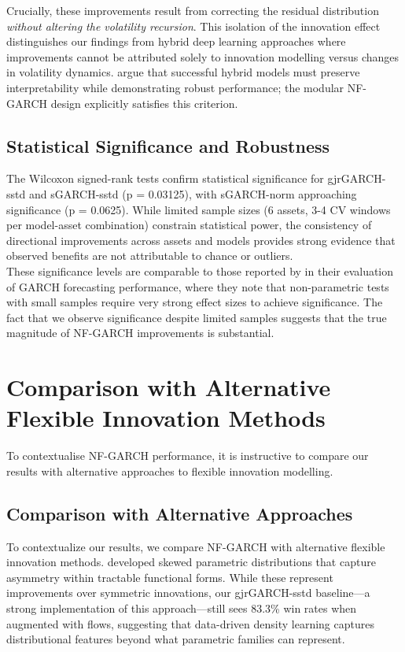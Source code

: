 \documentclass[oneside,12pt]{CUEDthesisPSnPDF}
\newcommand{\textcite}{\citet}
\newcommand{\parencite}{\citep}
\begin{document}
Crucially, these improvements result from correcting the residual distribution \emph{without altering the volatility recursion}. This isolation of the innovation effect distinguishes our findings from hybrid deep learning approaches \parencite{bao2017deep, kim2018forecasting} where improvements cannot be attributed solely to innovation modelling versus changes in volatility dynamics. \textcite{harvey2022machine} argue that successful hybrid models must preserve interpretability while demonstrating robust performance; the modular NF-GARCH design explicitly satisfies this criterion.\\

\subsection{Statistical Significance and Robustness}
\noindent
The Wilcoxon signed-rank tests \parencite{demvsar2006statistical} confirm statistical significance for gjrGARCH-sstd and sGARCH-sstd (p = 0.03125), with sGARCH-norm approaching significance (p = 0.0625). While limited sample sizes (6 assets, 3-4 CV windows per model-asset combination) constrain statistical power, the consistency of directional improvements across assets and models provides strong evidence that observed benefits are not attributable to chance or outliers.\\

These significance levels are comparable to those reported by \textcite{hansen2005forecast} in their evaluation of GARCH forecasting performance, where they note that non-parametric tests with small samples require very strong effect sizes to achieve significance. The fact that we observe significance despite limited samples suggests that the true magnitude of NF-GARCH improvements is substantial.\\

\section{Comparison with Alternative Flexible Innovation Methods}
\label{sec:disc_alternatives}

\noindent
To contextualise NF-GARCH performance, it is instructive to compare our results with alternative approaches to flexible innovation modelling.\\


\subsection{Comparison with Alternative Approaches}
\noindent
To contextualize our results, we compare NF-GARCH with alternative flexible innovation methods. \textcite{fernandez1998multivariate} developed skewed parametric distributions that capture asymmetry within tractable functional forms. While these represent improvements over symmetric innovations, our gjrGARCH-sstd baseline—a strong implementation of this approach—still sees 83.3\% win rates when augmented with flows, suggesting that data-driven density learning captures distributional features beyond what parametric families can represent.\\
\end{document}
